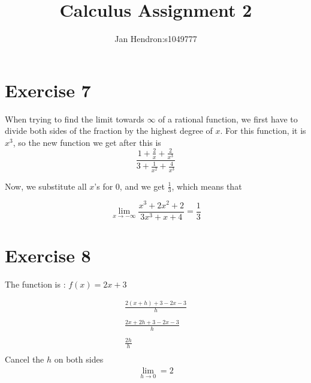 \documentclass[11pt]{article}
\title{Calculus Assignment 2}
\author{Jan Hendron:s1049777}
\begin{document}
\maketitle

\section*{Exercise 7}

When trying to find the limit towards \(\infty\) of a rational function, we first have to divide both sides of the fraction by the highest degree of $x$.
For this function, it is $x^{3}$, so the new function we get after this is
\[
\frac{1+\frac{2}{x}+\frac{2}{x^{3}}}{3+\frac{1}{x^{2}}+\frac{4}{x^{3}}}
\]

Now, we substitute all $x$'s for 0, and we get $\frac{1}{3}$, which means that

\[
\lim_{x \rightarrow - \infty}\frac{x^{3}+2x^{2}+2}{3x^{3}+x+4} = \frac{1}{3}
\]

\section*{Exercise 8}

The function is : $f(x) = 2x+3$

\begin{gather*}
  \frac{2(x+h)+3-2x-3}{h} \\
  \\
  \frac{2x+2h+3-2x-3}{h} \\
  \\
  \frac{2h}{h} \\
\end{gather*}
Cancel the $h$ on both sides
\begin{gather*}
  \lim_{h\rightarrow 0} = 2
\end{gather*}
\end{document}
